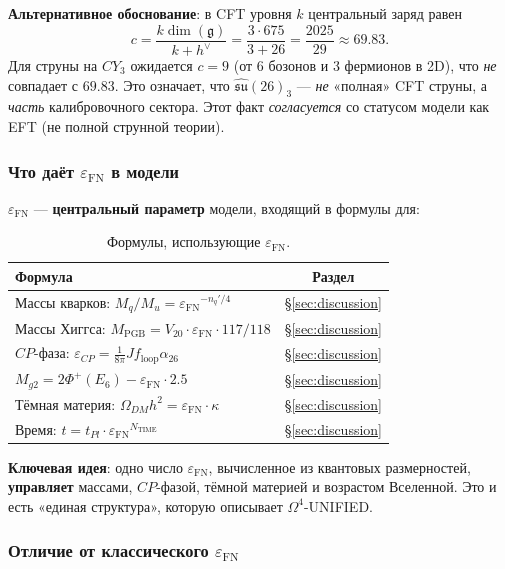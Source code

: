 \documentclass[11pt,a4paper]{article}
\newcommand{\CY}{\ensuremath{CY_3}}
\newcommand{\Om}{\ensuremath{\Omega^4}}
\newcommand{\epsFN}{\ensuremath{\varepsilon_{\text{FN}}}}
\theoremstyle{definition}
\begin{document}
\medskip\noindent
\textbf{Альтернативное обоснование}: в CFT уровня $k$ центральный
заряд равен
\begin{equation}
    c = \frac{k \dim(\mathfrak{g})}{k + h^\vee}
    = \frac{3 \cdot 675}{3 + 26} = \frac{2025}{29} \approx 69.83.
\end{equation}
Для струны на $\CY$ ожидается $c = 9$ (от 6 бозонов и 3 фермионов
в 2D), что \emph{не} совпадает с $69.83$. Это означает, что
$\hat{\mathfrak{su}}(26)_3$ --- \emph{не} «полная» CFT струны,
а \emph{часть} калибровочного сектора. Этот факт \emph{согласуется}
со статусом модели как EFT (не полной струнной теории).

\subsubsection{Что даёт \texorpdfstring{$\epsFN$}{} в модели}

$\epsFN$ --- \textbf{центральный параметр} модели, входящий
в формулы для:

\begin{table}[ht]
\centering
\caption{Формулы, использующие \texorpdfstring{$\epsFN$}{}.}
\label{tab:eps-fn-uses}
\begin{tabular}{lc}
\toprule
Формула & Раздел \\
\midrule
Массы кварков: $M_q/M_u = \epsFN^{-n_q'/4}$ & \S\ref{sec:discussion} \\
Массы Хиггса: $M_{\text{PGB}} = V_{20} \cdot \epsFN \cdot 117/118$ & \S\ref{sec:discussion} \\
$CP$-фаза: $\varepsilon_{CP} = \frac{1}{8\pi} J f_{\text{loop}} \alpha_{26}$ & \S\ref{sec:discussion} \\
$M_{g2} = 2 \Phi^+(E_6) - \epsFN \cdot 2.5$ & \S\ref{sec:discussion} \\
Тёмная материя: $\Omega_{DM} h^2 = \epsFN \cdot \kappa$ & \S\ref{sec:discussion} \\
Время: $t = t_{Pl} \cdot \epsFN^{N_{\text{TIME}}}$ & \S\ref{sec:discussion} \\
\bottomrule
\end{tabular}
\end{table}

\textbf{Ключевая идея}: одно число $\epsFN$, вычисленное
из квантовых размерностей, \textbf{управляет} массами, $CP$-фазой,
тёмной материей и возрастом Вселенной. Это и есть «единая
структура», которую описывает $\Om$-UNIFIED.

\subsubsection{Отличие от классического \texorpdfstring{$\varepsilon_{\text{FN}}$}{epsilon\_FN}}
\end{document}
